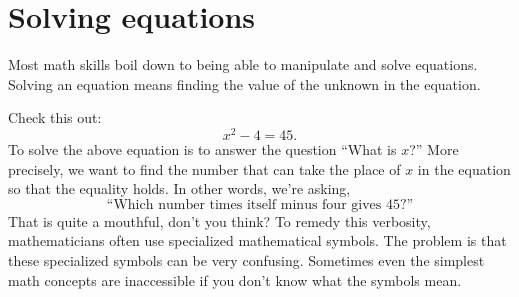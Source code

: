 
\section{Solving equations}
\label{sec:solving_equations}

Most math skills boil down to being able to manipulate and solve equations. 
Solving an equation means finding the value of the unknown in the equation.  

Check this  out:
\[
 x^2-4=45.
\]
To solve the above equation is to answer
the question ``What is $x$?''
More precisely, we want to find the number that can take the 
place of $x$ in the equation so that the equality holds.
In other words, we're asking,
\[
  \text{``Which number times itself minus four gives 45?''}
\]
That is quite a mouthful, don't you think? 
To remedy this verbosity, mathematicians often use specialized mathematical symbols.  
The problem is that these specialized symbols can be very confusing. 
Sometimes even the simplest math concepts are inaccessible if you don't know what the symbols mean. 



